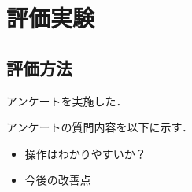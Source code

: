 \chapter{評価実験}
\thispagestyle{fancy}


\section{評価方法}
アンケートを実施した．


アンケートの質問内容を以下に示す．
\begin{itemize}
  \item 操作はわかりやすいか？
  \item 今後の改善点   
\end{itemize}


